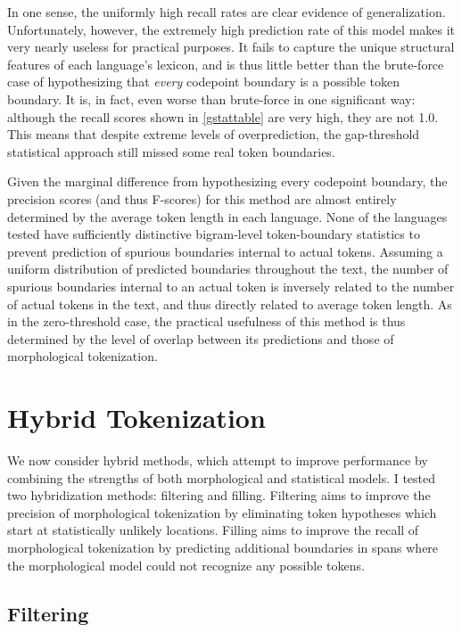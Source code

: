 In one sense, the uniformly high recall rates are clear evidence of generalization. Unfortunately, however, the extremely high prediction rate of this model makes it very nearly useless for practical purposes. It fails to capture the unique structural features of each language's lexicon, and is thus little better than the brute-force case of hypothesizing that \textit{every} codepoint boundary is a possible token boundary. It is, in fact, even worse than brute-force in one significant way: although the recall scores shown in \ref{gstattable} are very high, they are not 1.0. This means that despite extreme levels of overprediction, the gap-threshold statistical approach still missed some real token boundaries.

Given the marginal difference from hypothesizing every codepoint boundary, the precision scores (and thus F-scores) for this method are almost entirely determined by the average token length in each language. None of the languages tested have sufficiently distinctive bigram-level token-boundary statistics to prevent prediction of spurious boundaries internal to actual tokens. Assuming a uniform distribution of predicted boundaries throughout the text, the number of spurious boundaries internal to an actual token is inversely related to the number of actual tokens in the text, and thus directly related to average token length. As in the zero-threshold case, the practical usefulness of this method is thus determined by the level of overlap between its predictions and those of morphological tokenization.

\FloatBarrier

\section{Hybrid Tokenization}

We now consider hybrid methods, which attempt to improve performance by combining the strengths of both morphological and statistical models. I tested two hybridization methods: filtering and filling. Filtering aims to improve the precision of morphological tokenization by eliminating token hypotheses which start at statistically unlikely locations. Filling aims to improve the recall of morphological tokenization by predicting additional boundaries in spans where the morphological model could not recognize any possible tokens.

\subsection{Filtering}
\FloatBarrier


